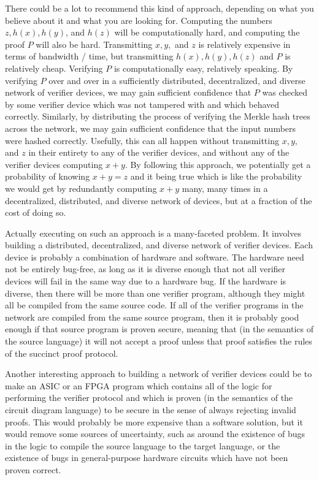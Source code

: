\documentclass[11pt]{article}
\begin{document}
There could be a lot to recommend this kind of approach, depending on
what you believe about it and what you are looking for. Computing the numbers $z, h(x), h(y)$,
and $h(z)$ will be computationally hard, and computing the proof $P$ will also be hard.
Transmitting $x, y,$ and $z$ is relatively expensive in terms of bandwidth / time,
but transmitting $h(x), h(y), h(z)$ and $P$ is relatively cheap. Verifying $P$ is
computationally easy, relatively speaking. By verifying $P$ over and over in a sufficiently
distributed, decentralized, and diverse network of verifier devices, we may gain
sufficient confidence that $P$ was checked by some verifier device which was not tampered
with and which behaved correctly. Similarly, by distributing the process of verifying
the Merkle hash trees across the network, we may gain sufficient confidence that the
input numbers were hashed correctly. Usefully, this can all happen without transmitting
$x, y,$ and $z$ in their entirety to any of the verifier devices, and without any
of the verifier devices computing $x + y$. By following this approach, we potentially get
a probability of knowing $x + y = z$ and it being true which is like the probability we
would get by redundantly computing $x + y$ many, many times in a decentralized, distributed,
and diverse network of devices, but at a fraction of the cost of doing so.

Actually executing on such an approach is a many-faceted problem. It involves building
a distributed, decentralized, and diverse network of verifier devices. Each device is probably a
combination of hardware and software. The hardware need not be entirely bug-free, as long as it
is diverse enough that not all verifier devices will fail in the same way due to a hardware bug.
If the hardware is diverse, then there will be more than one verifier program, although they
might all be compiled from the same source code. If all of the verifier programs in the network
are compiled from the same source program, then it is probably good enough if that source
program is proven secure, meaning that (in the semantics of the source language) it will not
accept a proof unless that proof satisfies the rules of the succinct proof protocol.

Another interesting approach to building a network of verifier devices could be to
make an ASIC or an FPGA program which contains all of the logic for
performing the verifier protocol and which is proven (in the semantics of the circuit diagram
language) to be secure in the sense of always rejecting invalid proofs. This would
probably be more expensive than a software solution, but it would remove some sources
of uncertainty, such as around the existence of bugs in the logic to compile the source
language to the target language, or the existence of bugs in general-purpose hardware
circuits which have not been proven correct.
\end{document}
